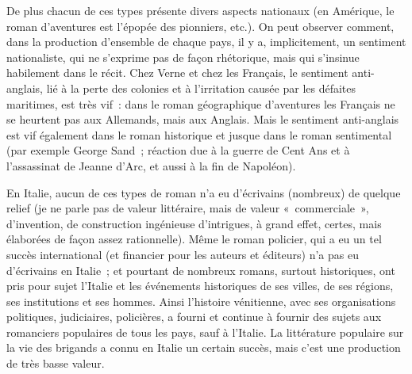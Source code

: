 \documentclass[french,twoside]{book} %
\begin{document}
\noindent De plus chacun de ces types présente divers aspects nationaux (en Amérique, le roman d’aventures est l’épopée des pionniers, etc.). On peut observer comment, dans la production d’ensemble de chaque pays, il y a, implicitement, un sentiment nationaliste, qui ne s’exprime pas de façon rhétorique, mais qui s’insinue habilement dans le récit. Chez Verne et chez les Français, le sentiment anti-anglais, lié à la perte des colonies et à l’irritation causée par les défaites maritimes, est très vif : dans le roman géographique d’aventures les Français ne se heurtent pas aux Allemands, mais aux Anglais. Mais le sentiment anti-anglais est vif également dans le roman historique et jusque dans le roman sentimental (par exemple George Sand ; réaction due à la guerre de Cent Ans et à l’assassinat de Jeanne d’Arc, et aussi à la fin de Napoléon).\par
En Italie, aucun de ces types de roman n’a eu d’écrivains (nombreux) de quelque relief (je ne parle pas de valeur littéraire, mais de valeur « commerciale », d’invention, de construction ingénieuse d’intrigues, à grand effet, certes, mais élaborées de façon assez rationnelle). Même le roman policier, qui a eu un tel succès international (et financier pour les auteurs et éditeurs) n’a pas eu d’écrivains en Italie ; et pourtant de nombreux romans, surtout historiques, ont pris pour sujet l’Italie et les événements historiques de ses villes, de ses régions, ses institutions et ses hommes. Ainsi l’histoire vénitienne, avec ses organisations politiques, judiciaires, policières, a fourni et continue à fournir des sujets aux romanciers populaires de tous les pays, sauf à l’Italie. La littérature populaire sur la vie des brigands a connu en Italie un certain succès, mais c’est une production de très basse valeur.\par
\end{document}

